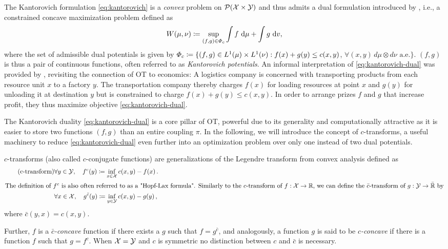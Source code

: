 The Kantorovich formulation \eqref{eq:kantorovich} is a \emph{convex} problem on ${\mathcal{P}}(\mathcal{X} \times \mathcal{Y})$ and thus admits a dual formulation introduced by \citet{kantorovich1942transfer}, i.e., a constrained concave maximization problem defined as
\begin{equation} \label{eq:kantorovich-dual}
    W(\mu, \nu)\coloneqq\sup _{(f, g) \in \Phi_{c}} \int f \mathrm{~d} \mu+\int g \mathrm{~d} v,
\end{equation}
 where the set of admissible dual potentials is given by $\Phi_c \coloneqq \{(f, g) \in L^{1}(\mu) \times L^{1}(\nu): f(x)+g(y) \leq c(x,y)$, $\forall(x, y)\, d\mu \otimes d\nu \text{ a.e.}\}$.
$(f, g)$ is thus a pair of continuous functions, often referred to as \emph{Kantorovich potentials}.
An informal interpretation of \eqref{eq:kantorovich-dual} was provided by \citet{caffarelli2003monge}, revisiting the connection of \acrshort{OT} to economics: 
A logistics company is concerned with transporting products from each resource unit $x$ to a factory $y$. The transportation company thereby charges $f(x)$ for loading resources at point $x$ and $g(y)$ for unloading it at destination $y$ but is constrained to charge $f(x)+g(y) \le c(x,y)$. In order to arrange prizes $f$ and $g$ that increase profit, they thus maximize objective \eqref{eq:kantorovich-dual}.

The Kantorovich duality \eqref{eq:kantorovich-dual} is a core pillar of \acrlong{OT}, powerful due to its generality and computationally attractive as it is easier to store two functions $(f, g)$ than an entire coupling $\pi$.
In the following, we will introduce the concept of $c$-transforms, a useful machinery to reduce \eqref{eq:kantorovich-dual} even further into an optimization problem over only one instead of two dual potentials.
\begin{definition}[$c$-transform] \label{eq:c-transform} 
	$c$-transforms (also called $c$-conjugate functions) are generalizations of the Legendre transform from convex analysis defined as
\begin{align*} \tag{c-transform}
	& \forall y \in {\mathcal{Y}}, \quad f^c(y) \coloneqq \inf _{x \in {\mathcal{X}}} c(x, y)-f(x) \,. \\
	\intertext{The definition of $f^c$ is also often referred to as a "Hopf-Lax formula". Similarly to the $c$-transform of $f : {\mathcal{X}} \rightarrow \mathbb{R}$, we can define the $\bar{c}$-transform of $g : {\mathcal{Y}} \rightarrow \bar{\mathbb{R}}$ by}
	& \forall x \in {\mathcal{X}}, \quad g^{\bar{c}}(y) \coloneqq \inf _{y \in {\mathcal{Y}}} c(x, y)-g(y) \,,
\end{align*}
where $\bar{c}(y, x) = c(x, y)$. 
\end{definition}
Further, $f$ is a \textit{$\bar{c}$-concave} function if there exists a $g$ such that $f = g^{\bar{c}}$, and analogously, a function $g$ is said to be \textit{$c$-concave} if there is a function $f$ such that $g = f^c$.
When ${\mathcal{X}} = {\mathcal{Y}}$ and $c$ is symmetric no distinction between $c$ and $\bar{c}$ is necessary.

